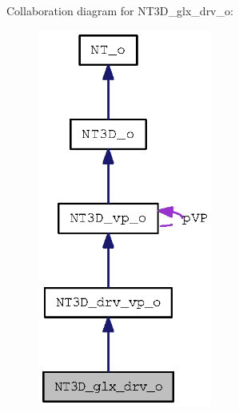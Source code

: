 Collaboration diagram for NT3D\_\-glx\_\-drv\_\-o:
\nopagebreak
\begin{figure}[H]
\begin{center}
\leavevmode
\includegraphics[width=162pt]{class_n_t3_d__glx__drv__o__coll__graph}
\end{center}
\end{figure}
